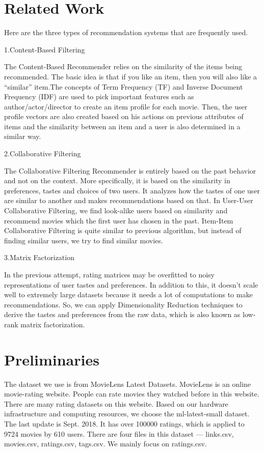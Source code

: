 \documentclass[sigconf]{acmart}
\begin{document}
\section{Related Work}\label{sec:related}
Here are the three types of recommendation systems that are frequently used. 
\item{1.Content-Based Filtering}
\item{The Content-Based Recommender relies on the similarity of the items being recommended. The basic idea is that if you like an item, then you will also like a “similar” item.The concepts of Term Frequency (TF) and Inverse Document Frequency (IDF) are used to pick important features such as author/actor/director to create an item profile for each movie. Then, the user profile vectors are also created based on his actions on previous attributes of items and the similarity between an item and a user is also determined in a similar way.}
\item{2.Collaborative Filtering}
\item{The Collaborative Filtering Recommender is entirely based on the past behavior and not on the context. More specifically, it is based on the similarity in preferences, tastes and choices of two users. It analyzes how the tastes of one user are similar to another and makes recommendations based on that. In User-User Collaborative Filtering, we find look-alike users based on similarity and recommend movies which the first user has chosen in the past. Item-Item Collaborative Filtering is quite similar to previous algorithm, but instead of finding similar users, we try to find similar movies.}
\item{3.Matrix Factorization}
\item{In the previous attempt, rating matrices may be overfitted to noisy representations of user tastes and preferences. In addition to this, it doesn’t scale well to extremely large datasets because it needs a lot of computations to make recommendations. So, we can apply Dimensionality Reduction techniques to derive the tastes and preferences from the raw data, which is also known as low-rank matrix factorization.}


\section{Preliminaries}\label{sec:preliminary}
The dataset we use is from MovieLens Latest Datasets. MovieLens is an online movie-rating website. People can rate movies they watched before in this website. There are many rating datasets on this website. Based on our hardware infrastructure and computing resources, we choose the ml-latest-small dataset. The last update is Sept. 2018. It has over 100000 ratings, which is applied to 9724 movies by 610 users. There are four files in this dataset --- links.csv, movies.csv, ratings.csv, tags.csv. We mainly focus on ratings.csv.
\end{document}
